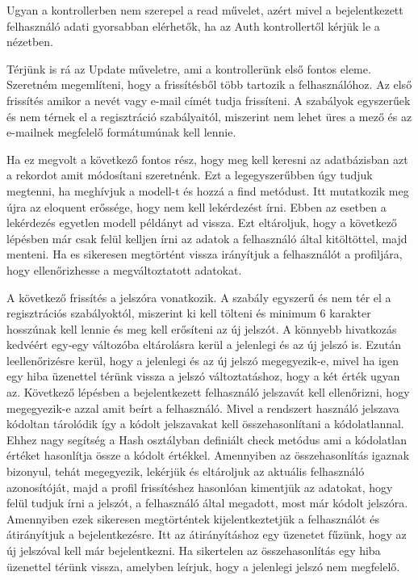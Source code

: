 \documentclass[
]{thesis-ekf}
\theoremstyle{definition}
\theoremstyle{remark}
\begin{document}
Ugyan a kontrollerben nem szerepel a read művelet, azért mivel a bejelentkezett felhasználó adati gyorsabban elérhetők, ha az Auth kontrollertől kérjük le a nézetben.

Térjünk is rá az Update műveletre, ami a kontrollerünk első fontos eleme. Szeretném megemlíteni, hogy a frissítésből több tartozik a felhasználóhoz. Az első frissítés amikor a nevét vagy e-mail címét tudja frissíteni. A szabályok egyszerűek és nem térnek el a regisztráció szabályaitól, miszerint nem lehet üres a mező és az e-mailnek megfelelő formátumúnak kell lennie.

Ha ez megvolt a következő fontos rész, hogy meg kell keresni az adatbázisban azt a rekordot amit módosítani szeretnénk. Ezt a legegyszerűbben úgy tudjuk megtenni, ha meghívjuk a modell-t és hozzá a find metódust. Itt mutatkozik meg újra az eloquent erőssége, hogy nem kell lekérdezést írni. Ebben az esetben a lekérdezés egyetlen modell példányt ad vissza. Ezt eltároljuk, hogy a következő lépésben már csak felül kelljen írni az adatok a felhasználó által kitöltöttel, majd menteni. Ha es sikeresen megtörtént vissza irányítjuk a felhasználót a profiljára, hogy ellenőrizhesse a megváltoztatott adatokat. 

A következő frissítés a jelszóra vonatkozik. A szabály egyszerű és nem tér el a regisztrációs szabályoktól, miszerint ki kell tölteni és minimum 6 karakter hosszúnak kell lennie és meg kell erősíteni az új jelszót. A könnyebb hivatkozás kedvéért egy-egy változóba eltárolásra kerül a jelenlegi és az új jelszó is. Ezután leellenőrizésre kerül, hogy a jelenlegi és az új jelszó megegyezik-e, mivel ha igen egy hiba üzenettel térünk vissza a jelszó változtatáshoz, hogy a két érték ugyan az. Következő lépésben a bejelentkezett felhasználó jelszavát kell ellenőrizni, hogy megegyezik-e azzal amit beírt a felhasználó. Mivel a rendszert használó jelszava kódoltan tárolódik így a kódolt jelszavakat kell összehasonlítani a kódolatlannal. Ehhez nagy segítség a Hash osztályban definiált check metódus ami a kódolatlan értéket hasonlítja össze a kódolt értékkel. Amennyiben az összehasonlítás igaznak bizonyul, tehát megegyezik, lekérjük és eltároljuk az aktuális felhasználó azonosítóját, majd a profil frissítéshez hasonlóan kimentjük az adatokat, hogy felül tudjuk írni a jelszót, a felhasználó által megadott, most már kódolt jelszóra. Amennyiben ezek sikeresen megtörténtek kijelentkeztetjük a felhasználót és átirányítjuk a bejelentkezésre. Itt az átirányításhoz egy üzenetet fűzünk, hogy az új jelszóval kell már bejelentkezni. Ha sikertelen az összehasonlítás egy hiba üzenettel térünk vissza, amelyben leírjuk, hogy a jelenlegi jelszó nem megfelelő. 
\end{document}
